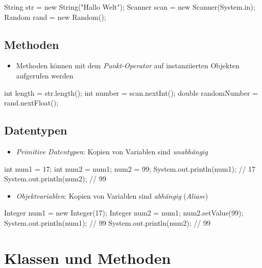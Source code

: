\documentclass[a4paper,10pt, dvipsnames]{report}
\begin{document}
\begin{javacodebox}
String str = new String("Hallo Welt");
Scanner scan = new Scanner(System.in);
Random rand = new Random();
\end{javacodebox}

\subsection{Methoden}

\begin{itemize}
    \item Methoden können mit dem \textit{Punkt-Operator} auf instanziierten Objekten aufgerufen werden
\end{itemize}

\begin{javacodebox}
int length = str.length();
int number = scan.nextInt();
double randomNumber = rand.nextFloat();
\end{javacodebox}

\subsection{Datentypen}

\begin{itemize}
    \item \textit{Primitive Datentypen}: Kopien von Variablen sind \textit{unabhängig}
\end{itemize}

\begin{javacodebox}
int num1 = 17;
int num2 = num1;
num2 = 99;
System.out.println(num1); // 17
System.out.println(num2); // 99
\end{javacodebox}

\begin{itemize}
    \item \textit{Objektvariablen}: Kopien von Variablen sind \textit{abhängig} (\textit{Aliase})
\end{itemize}

\begin{javacodebox}
Integer num1 = new Integer(17);
Integer num2 = num1;
num2.setValue(99);
System.out.println(num1); // 99
System.out.println(num2); // 99
\end{javacodebox}

\section{Klassen und Methoden}
\end{document}
